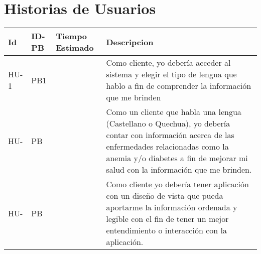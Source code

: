\chapter{Historias de Usuarios}
\begin{table}[htbp]
	\begin{center}
		\begin{tabular}{| p{1.8cm}| p{2.1cm}| p{3.8cm} |p{7.8cm} |}
			\hline
		\textbf{Id} & \textbf{ID-PB} & \textbf {Tiempo Estimado} & \textbf{Descripcion}
		\\\hline  
 		HU-1&PB1& &Como cliente, yo debería acceder al sistema y elegir el tipo de lengua que hablo a fin de comprender la información que me brinden
 \\ \hline
	 	HU-&PB& &Como un cliente que habla una lengua (Castellano o Quechua), yo debería contar con información acerca de las enfermedades relacionadas como la anemia y/o diabetes a fin de mejorar mi salud con la información que me brinden. 
 \\ \hline
 		HU-&PB& &Como cliente yo debería tener aplicación con un diseño de vista que pueda aportarme la información ordenada y legible con el fin de tener un mejor entendimiento o interacción con la aplicación.
  \\ \hline
		\end{tabular}
\end{center}
\end{table}